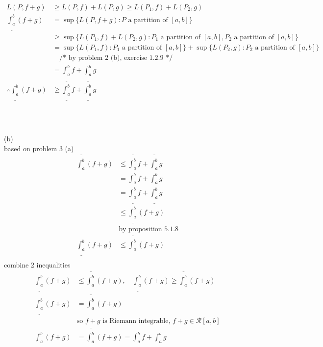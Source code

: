 \documentclass[12pt, border = 4pt, multi]{article} %
\begin{document}
\begin{align*}
L(P, f + g) &\geq L(P, f) + L(P, g) \geq L(P_1, f) + L(P_2, g)\\
\underline{\int_a ^ b} (f + g) &= \sup\{L(P, f + g): P \text{ a partition of }[a, b]\}\\
&\geq \sup\{L(P_1, f) + L(P_2, g): P_1 \text{ a partition of }[a, b], P_2 \text{ a partition of }[a, b]\}\\
&= \sup\{L(P_1, f): P_1 \text{ a partition of }[a, b]\} + \sup\{L(P_2, g): P_2 \text{ a partition of }[a, b]\}\\
&\quad\text{/* by problem 2 (b), exercise 1.2.9 */}\\
&= \underline{\int_a ^ b} f + \underline{\int_a ^ b} g\\
\therefore \underline{\int_a ^ b} (f + g) &\geq \underline{\int_a ^ b} f + \underline{\int_a ^ b} g\\
\end{align*}
\\
\\
\\
(b)\\
based on problem 3 (a)
\begin{align*}
\overline{\int_a ^ b} (f + g) &\leq \overline{\int_a ^ b} f + \overline{\int_a ^ b} g\\
&= \int_a ^ b f + \int_a ^ b g\\
&= \underline{\int_a ^ b} f + \underline{\int_a ^ b} g\\
&\leq \underline{\int_a ^ b} (f + g)\\
&\text{by proposition 5.1.8}\\
\underline{\int_a ^ b} (f + g) &\leq \overline{\int_a ^ b} (f + g)\\
\end{align*}
combine 2 inequalities
\begin{align*}
\underline{\int_a ^ b} (f + g) &\leq \overline{\int_a ^ b} (f + g), \quad \underline{\int_a ^ b} (f + g) \geq \overline{\int_a ^ b} (f + g)\\
\underline{\int_a ^ b} (f + g) &= \overline{\int_a ^ b} (f + g)\\
&\text{so $f + g$ is Riemann integrable, $f + g \in \mathscr{R}[a, b]$}\\
\int_a ^ b (f + g) &= \overline{\int_a ^ b} (f + g) = \int_a ^ b f + \int_a ^ b g\\
\end{align*}
\\
\\
\\
\end{document}
